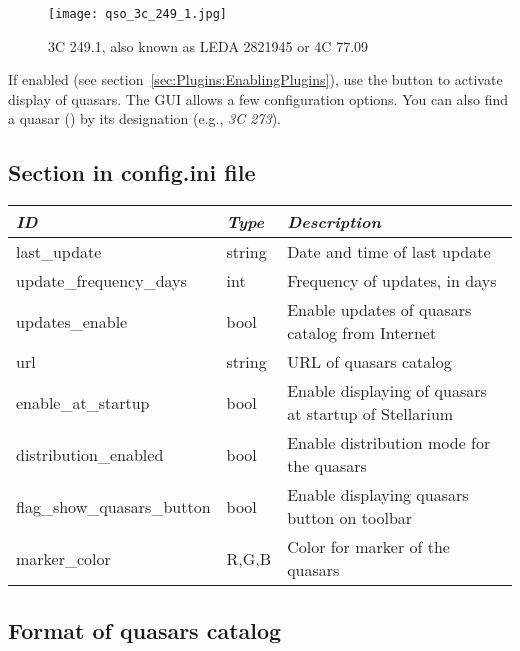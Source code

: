\begin{figure}[ht]
\texttt{[image: qso\_3c\_249\_1.jpg]}
\caption{3C 249.1, also known as LEDA 2821945 or 4C 77.09}
\label{fig:plugin:Quasars}
\end{figure}




If enabled (see section~\ref{sec:Plugins:EnablingPlugins}), use the
 button to activate display of
quasars. The GUI allows a few configuration options.  You can also
find a quasar () by its designation (e.g., \emph{3C 273}).

\subsection{Section  in config.ini file}
\label{sec:plugins:Quasars:config}

\begin{tabularx}{\textwidth}{l|l|X}\toprule
\emph{ID}               & \emph{Type} & \emph{Description}\\\midrule
last\_update                & string & Date and time of last update\\\midrule
update\_frequency\_days     & int    & Frequency of updates, in days\\\midrule
updates\_enable             & bool   & Enable updates of quasars catalog from Internet \\\midrule
url                         & string & URL of quasars catalog \\\midrule
enable\_at\_startup         & bool   & Enable displaying of quasars at startup of Stellarium \\\midrule
distribution\_enabled       & bool   & Enable distribution mode for the quasars \\\midrule
flag\_show\_quasars\_button & bool   & Enable displaying quasars button on toolbar \\\midrule
marker\_color               & R,G,B  & Color for marker of the quasars \\\bottomrule
\end{tabularx}

\newpage
\subsection{Format of quasars catalog}
\label{sec:plugins:Quasars:format}


